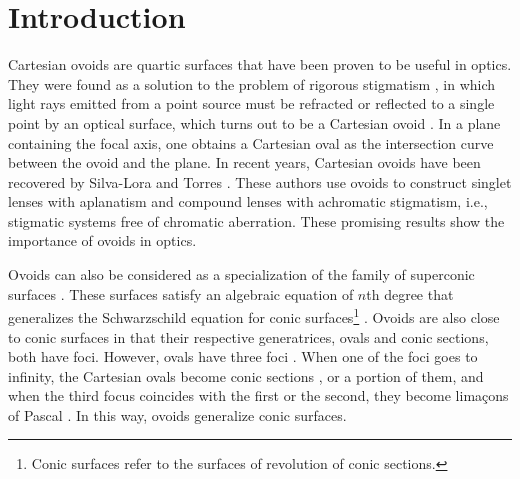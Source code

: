 \documentclass[12pt, ams, nofootinbib]{revtex4}
\theoremstyle{definition}
\begin{document}


\maketitle

\section{Introduction} %
\label{sec:intro}
Cartesian ovoids are quartic surfaces that have been proven to be useful in optics. They were found as a solution to the problem of rigorous stigmatism \cite{silva-Lora2020a}, in which light rays emitted from a point source must be refracted or reflected to a single point by an optical surface, which turns out to be a Cartesian ovoid \cite{descartes1637, southall1922}. In a plane containing the focal axis, one obtains a Cartesian oval as the intersection curve between the ovoid and the plane. In recent years, Cartesian ovoids have been recovered by Silva-Lora and Torres \cite{silva-Lora2020c, silva-Lora2021, silva-Lora2022}. These authors use ovoids to construct singlet lenses with aplanatism and compound lenses with achromatic stigmatism, i.e., stigmatic systems free of chromatic aberration. These promising results show the importance of ovoids in optics.

Ovoids can also be considered as a specialization of the family of superconic surfaces	 \cite{Greynolds2002, Cho2016, silva-Lora2020b}. These surfaces satisfy an algebraic equation of $n$th degree that generalizes the Schwarzschild equation for conic surfaces\footnote{Conic surfaces refer to the surfaces of revolution of conic sections.} \cite{schwarzschild1905conic, silva-Lora2020b}. Ovoids are also close to conic surfaces in that their respective generatrices, ovals and conic sections, both have foci. However, ovals have three foci \cite{chasles1837, williamson1873, johnson1875bipolar}. When one of the foci goes to infinity, the Cartesian ovals become conic sections \cite{chasles1837, johnson1875bipolar}, or a portion of them, and when the third focus coincides with the first or the second, they become limaçons of Pascal \cite{johnson1875bipolar}. In this way, ovoids generalize conic surfaces. 
\end{document}
